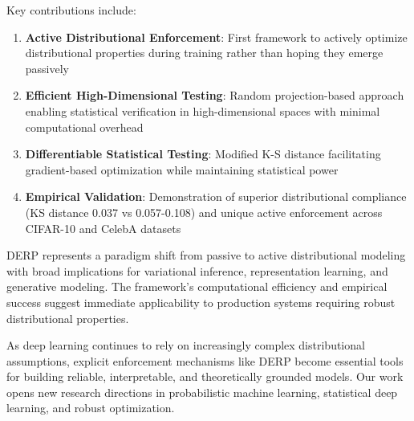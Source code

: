 \documentclass[11pt]{article}
\begin{document}
Key contributions include:

\begin{enumerate}
\item \textbf{Active Distributional Enforcement}: First framework to actively optimize distributional properties during training rather than hoping they emerge passively
\item \textbf{Efficient High-Dimensional Testing}: Random projection-based approach enabling statistical verification in high-dimensional spaces with minimal computational overhead  
\item \textbf{Differentiable Statistical Testing}: Modified K-S distance facilitating gradient-based optimization while maintaining statistical power
\item \textbf{Empirical Validation}: Demonstration of superior distributional compliance (KS distance 0.037 vs 0.057-0.108) and unique active enforcement across CIFAR-10 and CelebA datasets
\end{enumerate}

DERP represents a paradigm shift from passive to active distributional modeling with broad implications for variational inference, representation learning, and generative modeling. The framework's computational efficiency and empirical success suggest immediate applicability to production systems requiring robust distributional properties.

As deep learning continues to rely on increasingly complex distributional assumptions, explicit enforcement mechanisms like DERP become essential tools for building reliable, interpretable, and theoretically grounded models. Our work opens new research directions in probabilistic machine learning, statistical deep learning, and robust optimization.



\end{document}
